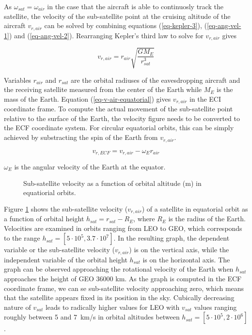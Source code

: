\documentclass[english, 12pt, a4paper, elec, utf8, a-1b, online]{aaltothesis}
\begin{document}
\noindent
As $\omega_{sat} = \omega_{air}$ in the case that the aircraft is able to continuosly track the satellite, the velocity of the sub-satellite point at the cruising altitude of the aircraft $v_{r, air}$ can be solved by combining equations (\ref{eq-kepler-3}), (\ref{eq-ang-vel-1}) and (\ref{eq-ang-vel-2}).
Rearranging Kepler's third law to solve for $v_{r, air}$ gives

\begin{equation} \label{eq-v-air-equatorial}
  v_{r, air} = r_{air} \sqrt{\frac{G M_E}{r_{sat}^3}}
\end{equation}

\noindent
Variables $r_{air}$ and $r_{sat}$ are the orbital radiuses of the eavesdropping aircraft and the receiving satellite measured from the center of the Earth while $M_E$ is the mass of the Earth.
Equation (\ref{eq-v-air-equatorial}) gives $v_{r, air}$ in the ECI coordinate frame.
To compute the actual movement of the sub-satellite point relative to the surface of the Earth, the velocity figure needs to be converted to the ECF coordinate system.
For circular equatorial orbits, this can be simply achieved by substracting the spin of the Earth from $v_{r, air}$.

\begin{equation}
  v_{r, ECF} = v_{r, air} - \omega_E r_{air}
\end{equation}

\noindent
$\omega_E$ is the angular velocity of the Earth at the equator.

\begin{figure}[h]
  \centering
  
  \caption{Sub-satellite velocity as a function of orbital altitude (m) in equatiorial orbits.}
  \label{fig-subsat-velocity-equatiorial}
\end{figure}

Figure \ref{fig-subsat-velocity-equatiorial} shows the sub-satellite velocity ($v_{r, air}$) of a satellite in equatorial orbit as a function of orbital height $h_{sat} = r_{sat} - R_{E}$, where $R_{E}$ is the radius of the Earth.
Velocities are examined in orbits ranging from LEO to GEO, which corresponds to the range $h_{sat} = [5 \cdot 10^5, 3.7 \cdot 10^7]$.
In the resulting graph, the dependent variable or the sub-satellite velocity ($v_{r, air}$) is on the vertical axis, while the independent variable of the orbital height $h_{sat}$ is on the horizontal axis.
The graph can be observed approaching the rotational velocity of the Earth when $h_{sat}$ approaches the height of GEO 36000 km.
As the graph is computed in the ECF coordinate frame, we can se sub-satellite velocity approaching zero, which means that the satellite appears fixed in its position in the sky.
Cubically decreasing nature of $v_{sat}$ leads to radically higher values for LEO with $v_{sat}$ values ranging roughly between 5 and 7\ km/s in orbital altitudes between $h_{sat} = [5 \cdot 10^5, 2 \cdot 10^6]$.
\end{document}

